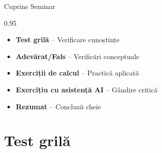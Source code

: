 \documentclass[9pt, aspectratio=169, t]{beamer}
\subtitle{Seminar 0: Fundamente}
\begin{document}
{
\begin{frame}
    \titlepage
\end{frame}
}

\begin{frame}{Cuprins Seminar}
    \begin{cminipage}{0.95\textwidth}
    \begin{itemize}\setlength{\itemsep}{0pt}
        \item \textbf{Test grilă} -- Verificare cunoștințe
        \vspace{0.15cm}
        \item \textbf{Adevărat/Fals} -- Verificări conceptuale
        \vspace{0.15cm}
        \item \textbf{Exerciții de calcul} -- Practică aplicată
        \vspace{0.15cm}
        \item \textbf{Exercițiu cu asistență AI} -- Gândire critică
        \vspace{0.15cm}
        \item \textbf{Rezumat} -- Concluzii cheie
    \end{itemize}
    \end{cminipage}
\end{frame}


\section{Test grilă}
\end{document}
